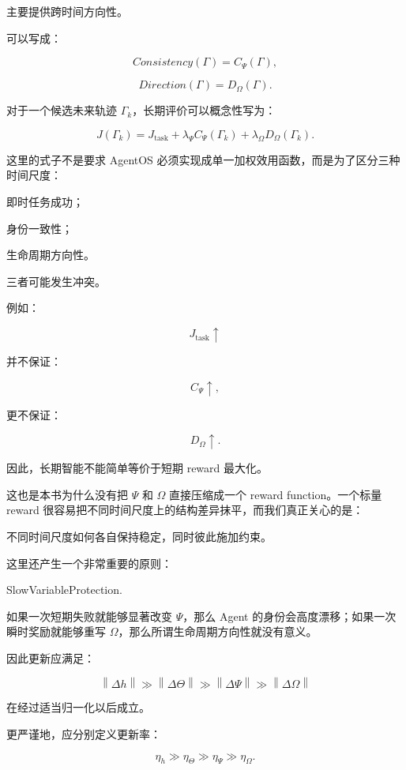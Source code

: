 主要提供跨时间方向性。

可以写成：

\[
Consistency(\Gamma)
=
C_{\Psi}(\Gamma),
\]

\[
Direction(\Gamma)
=
D_{\Omega}(\Gamma).
\]

对于一个候选未来轨迹 $\Gamma_k$，长期评价可以概念性写为：

\[
J(\Gamma_k)
=
J_{\mathrm{task}}
+
\lambda_{\Psi}C_{\Psi}(\Gamma_k)
+
\lambda_{\Omega}D_{\Omega}(\Gamma_k).
\]

这里的式子不是要求 AgentOS 必须实现成单一加权效用函数，而是为了区分三种时间尺度：

即时任务成功；

身份一致性；

生命周期方向性。

三者可能发生冲突。

例如：

\[
J_{\mathrm{task}}\uparrow
\]

并不保证：

\[
C_{\Psi}\uparrow,
\]

更不保证：

\[
D_{\Omega}\uparrow.
\]

因此，长期智能不能简单等价于短期 reward 最大化。

这也是本书为什么没有把 $\Psi$ 和 $\Omega$ 直接压缩成一个 reward function。一个标量 reward 很容易把不同时间尺度上的结构差异抹平，而我们真正关心的是：

\begin{statementbox}
不同时间尺度如何各自保持稳定，同时彼此施加约束。
\end{statementbox}

这里还产生一个非常重要的原则：

\begin{statementbox}
SlowVariableProtection.
\end{statementbox}

如果一次短期失败就能够显著改变 $\Psi$，那么 Agent 的身份会高度漂移；如果一次瞬时奖励就能够重写 $\Omega$，那么所谓生命周期方向性就没有意义。

因此更新应满足：

\[
\left\|
\Delta h
\right\|
\gg
\left\|
\Delta\Theta
\right\|
\gg
\left\|
\Delta\Psi
\right\|
\gg
\left\|
\Delta\Omega
\right\|
\]

在经过适当归一化以后成立。

更严谨地，应分别定义更新率：

\[
\eta_h
\gg
\eta_\Theta
\gg
\eta_\Psi
\gg
\eta_\Omega.
\]

